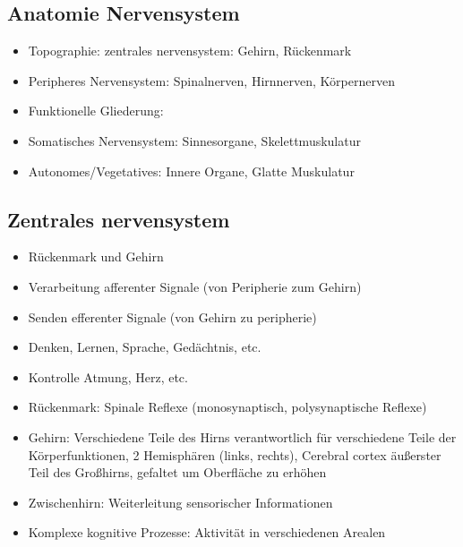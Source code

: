 \documentclass[a4paper,10pt,oneside]{article}
\begin{document}
\subsection{Anatomie Nervensystem}
\begin{itemize}
	\item Topographie: zentrales nervensystem: Gehirn, Rückenmark
	\item Peripheres Nervensystem: Spinalnerven, Hirnnerven, Körpernerven
	\item Funktionelle Gliederung:
	\item Somatisches Nervensystem: Sinnesorgane, Skelettmuskulatur
	\item Autonomes/Vegetatives: Innere Organe, Glatte Muskulatur
\end{itemize}

\subsection{Zentrales nervensystem}
\begin{itemize}
	\item Rückenmark und Gehirn
	\item Verarbeitung afferenter Signale (von Peripherie zum Gehirn)
	\item Senden efferenter Signale (von Gehirn zu peripherie)
	\item Denken, Lernen, Sprache, Gedächtnis, etc.
	\item Kontrolle Atmung, Herz, etc.
	\item Rückenmark: Spinale Reflexe (monosynaptisch, polysynaptische Reflexe)
	\item Gehirn: Verschiedene Teile des Hirns verantwortlich für verschiedene Teile der Körperfunktionen, 2 Hemisphären (links, rechts), Cerebral cortex äußerster Teil des Großhirns, gefaltet um Oberfläche zu erhöhen
	\item Zwischenhirn: Weiterleitung sensorischer Informationen
	\item Komplexe kognitive Prozesse: Aktivität in verschiedenen Arealen
\end{itemize}
\end{document}
